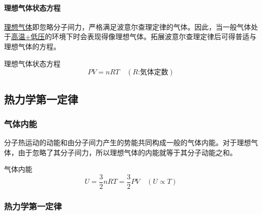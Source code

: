 \paragraph{理想气体状态方程}\underline{理想气体}即忽略分子间力，严格满足波意尔查理定律的气体。因此，当一般气体处于\underline{高温+低压}的环境下时会表现得像理想气体。拓展波意尔查理定律后可得普适与理想气体的方程。
\begin{itembox}[l]{理想气体状态方程}
    \begin{equation*}
        PV=nRT\quad(R\textrm{:気体定数})
    \end{equation*}
\end{itembox}

\subsection{热力学第一定律}

\subsubsection{气体内能}

分子热运动的动能和由分子间力产生的势能共同构成一般的气体内能。对于理想气体，由于忽略了其分子间力，所以理想气体的内能就等于其分子动能之和。
\begin{itembox}[l]{气体内能}
    \begin{equation*}
        U=\frac32nRT=\frac32PV\quad(U\propto T)
    \end{equation*}
\end{itembox}

\subsubsection{热力学第一定律}

